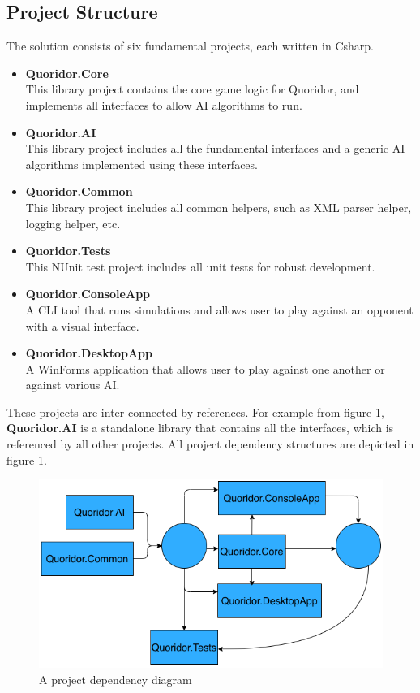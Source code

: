 \subsection{Project Structure}

The solution consists of six fundamental projects, each written in \ac{Csharp}.

\begin{itemize}
    \item \textbf{Quoridor.Core}\\
        This library project contains the core game logic for Quoridor, and implements all interfaces to allow \ac{AI} algorithms to run.
        
    \item \textbf{Quoridor.AI}\\
        This library project includes all the fundamental interfaces and a generic \ac{AI} algorithms implemented using these interfaces.

    \item \textbf{Quoridor.Common}\\
        This library project includes all common helpers, such as XML parser helper, logging helper, etc.

    \item \textbf{Quoridor.Tests}\\
        This NUnit test project includes all unit tests for robust development.

    \item \textbf{Quoridor.ConsoleApp}\\
        A CLI tool that runs simulations and allows user to play against an opponent with a visual interface.

    \item \textbf{Quoridor.DesktopApp}\\
        A WinForms application that allows user to play against one another or against various \ac{AI}.
\end{itemize}

These projects are inter-connected by references. For example from figure \ref{fig:proj_dep}, \textbf{Quoridor.AI} is a standalone library that contains all the interfaces, which is referenced by all other projects.
All project dependency structures are depicted in figure \ref{fig:proj_dep}.

\begin{figure}[h]
    \centering
    \includegraphics[width=.95\linewidth]{../img/project_structure.png}
    \caption{A project dependency diagram}
    \label{fig:proj_dep}
\end{figure}